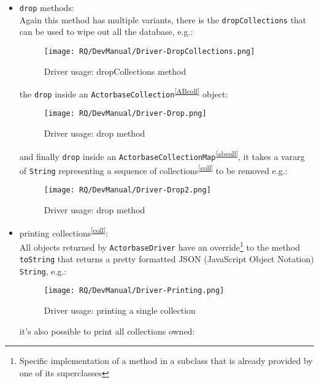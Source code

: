 \documentclass{scalatekids-article}
\begin{document}
\begin{itemize}
\item \verb=drop= methods:\\ Again this method has multiple variants, there is the
  \verb=dropCollections= that can be used to wipe out all the database, e.g.:
  \begin{figure}[H]
    \begin{center}
      \texttt{[image: RQ/DevManual/Driver-DropCollections.png]}
      \caption{Driver usage: dropCollections method}
    \end{center}
  \end{figure}
  the \verb=drop= inside an \verb=ActorbaseCollection=\textsuperscript{\ref{ABcoll}} object:
  \begin{figure}[H]
    \begin{center}
      \texttt{[image: RQ/DevManual/Driver-Drop.png]}
      \caption{Driver usage: drop method}
    \end{center}
  \end{figure}
  and finally \verb=drop= inside an \verb=ActorbaseCollectionMap=\textsuperscript{\ref{abcoll}}, it takes a
  vararg of \verb=String= representing a sequence of collections\textsuperscript{\ref{coll}} to be removed
  e.g.:
  \begin{figure}[H]
    \begin{center}
      \texttt{[image: RQ/DevManual/Driver-Drop2.png]}
      \caption{Driver usage: drop method}
    \end{center}
  \end{figure}
\item printing collections\textsuperscript{\ref{coll}}:\\All objects returned by \verb=ActorbaseDriver=
  have an override\footnote{Specific implementation of a method in a subclass that
    is already provided by one of its superclasses} to the method \verb=toString=
  that returns a pretty formatted JSON (JavaScript Object Notation) \verb=String=, e.g.:
  \begin{figure}[H]
    \begin{center}
      \texttt{[image: RQ/DevManual/Driver-Printing.png]}
      \caption{Driver usage: printing a single collection}
    \end{center}
  \end{figure}
  it's also possible to print all collections owned:
  \begin{figure}[H]

\end{figure}
\end{itemize}
\end{document}
